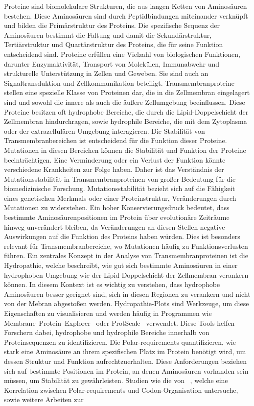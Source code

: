 \documentclass[german,version-2022-01]{uzl-thesis}
\begin{document}
Proteine sind biomolekulare Strukturen, die aus langen Ketten von Aminos\"auren bestehen. Diese Aminos\"auren sind durch Peptidbindungen miteinander verkn\"upft und bilden die Prim\"arstruktur des Proteins. Die spezifische Sequenz der Aminos\"auren bestimmt die Faltung und damit die Sekund\"arstruktur, Terti\"arstruktur und Quart\"arstruktur des Proteins, die f\"ur seine Funktion entscheidend sind. Proteine erf\"ullen eine Vielzahl von biologischen Funktionen, darunter Enzymaktivit\"at, Transport von Molek\"ulen, Immunabwehr und strukturelle Unterst\"utzung in Zellen und Geweben. Sie sind auch an Signaltransduktion und Zellkommunikation beteiligt. Transmembranproteine stellen eine spezielle Klasse von Proteinen dar, die in die Zellmembran eingelagert sind und sowohl die innere als auch die \"au\ss{}ere Zellumgebung beeinflussen. Diese Proteine besitzen oft hydrophobe Bereiche, die durch die Lipid-Doppelschicht der Zellmembran hindurchragen, sowie hydrophile Bereiche, die mit dem Zytoplasma oder der extrazellul\"aren Umgebung interagieren. Die Stabilit\"at von Transmembranbereichen ist entscheidend f\"ur die Funktion dieser Proteine. Mutationen in diesen Bereichen k\"onnen die Stabilit\"at und Funktion der Proteine beeintr\"achtigen. Eine Verminderung oder ein Verlust der Funktion k\"onnte verschiedene Krankheiten zur Folge haben. Daher ist das Verst\"andnis der Mutationsstabilit\"at in Transmembranproteinen von gro\ss{}er Bedeutung f\"ur die biomedizinische Forschung. Mutationsstabilit\"at bezieht sich auf die F\"ahigkeit eines genetischen Merkmals oder einer Proteinstruktur, Ver\"anderungen durch Mutationen zu widerstehen. Ein hoher Konservierungsdruck bedeutet, dass bestimmte Aminos\"aurenpositionen im Protein \"uber evolution\"are Zeitr\"aume hinweg unver\"andert bleiben, da Ver\"anderungen an diesen Stellen negative Auswirkungen auf die Funktion des Proteins haben w\"urden. Dies ist besonders relevant f\"ur Transmembranbereiche, wo Mutationen h\"aufig zu Funktionsverlusten f\"uhren. Ein zentrales Konzept in der Analyse von Transmembranproteinen ist die Hydropathie, welche beschreibt, wie gut sich bestimmte Aminos\"auren in einer hydrophoben Umgebung wie der Lipid-Doppelschicht der Zellmembran verankern k\"onnen. In diesem Kontext ist es wichtig zu verstehen, dass hydrophobe Aminos\"auren besser geeignet sind, sich in diesen Regionen zu verankern und nicht von der Mebran abgesto\ss{}en werden. Hydropathie-Plots sind Werkzeuge, um diese Eigenschaften zu visualisieren und werden h\"aufig in Programmen wie Membrane~Protein~Explorer~\cite{membraneProteinExplorer} oder ProtScale~\cite{protScale} verwendet. Diese Tools helfen Forschern dabei, hydrophobe und hydrophile Bereiche innerhalb von Proteinsequenzen zu identifizieren. Die Polar-requirements quantifizieren, wie stark eine Aminos\"aure an ihrem spezifischen Platz im Protein ben\"otigt wird, um dessen Struktur und Funktion aufrechtzuerhalten. Diese Anforderungen beziehen sich auf bestimmte Positionen im Protein, an denen Aminos\"auren vorhanden sein m\"ussen, um Stabilit\"at zu gew\"ahrleisten. Studien wie die von \citeauthor{mathew_physical_2008}~\cite{mathew_physical_2008}, welche eine Korrelation zwischen Polar-requirements und Codon-Organisation untersuche, sowie weitere Arbeiten zur 
\end{document}
